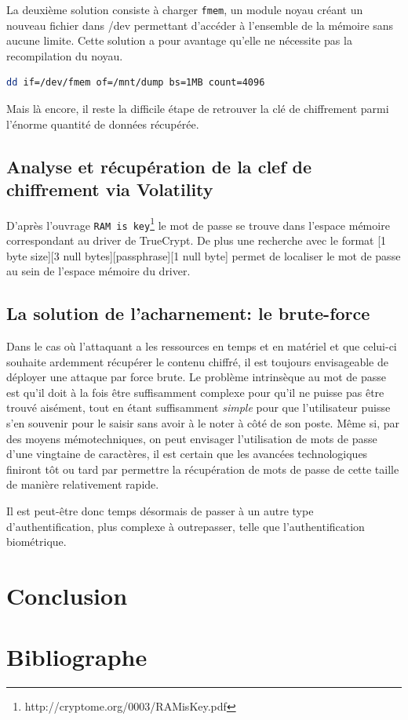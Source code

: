 \documentclass[12pt,a4paper]{article}
\begin{document}
La deuxième solution consiste à charger \texttt{fmem}, un module noyau créant un nouveau fichier 
dans /dev permettant d'accéder à l'ensemble de la mémoire sans aucune limite. Cette solution a pour avantage qu'elle ne nécessite pas la recompilation du noyau.

\begin{lstlisting}[language=Bash]
dd if=/dev/fmem of=/mnt/dump bs=1MB count=4096
\end{lstlisting}

Mais là encore, il reste la difficile étape de retrouver la clé de chiffrement 
parmi l'énorme quantité de données récupérée.


\subsection{Analyse et récupération de la clef de chiffrement via Volatility}
D'après l'ouvrage \texttt{RAM is key}\footnote{http://cryptome.org/0003/RAMisKey.pdf}
le mot de passe se trouve dans l'espace mémoire correspondant au driver de TrueCrypt.
De plus une recherche avec le format [1 byte size][3 null bytes][passphrase][1 null byte]
permet de localiser le mot de passe au sein de l'espace mémoire du driver.


\subsection{La solution de l'acharnement: le brute-force}

Dans le cas où l'attaquant a les ressources en temps et en matériel et que celui-ci souhaite 
ardemment récupérer le contenu chiffré, il est toujours envisageable de déployer une attaque 
par force brute. Le problème intrinsèque au mot de passe est qu'il doit à la fois être 
suffisamment complexe pour qu'il ne puisse pas être trouvé aisément, tout en étant suffisamment 
\textit{simple} pour que l'utilisateur puisse s'en souvenir pour le saisir sans avoir à le noter
à côté de son poste. Même si, par des moyens mémotechniques, on peut envisager l'utilisation de mots
de passe d'une vingtaine de caractères, il est certain que les avancées technologiques finiront tôt 
ou tard par permettre la récupération de mots de passe de cette taille de manière relativement 
rapide.

Il est peut-être donc temps désormais de passer à un autre type d'authentification, 
plus complexe à outrepasser, telle que l'authentification biométrique.




\section*{Conclusion}

\section*{Bibliographe}
\end{document}

